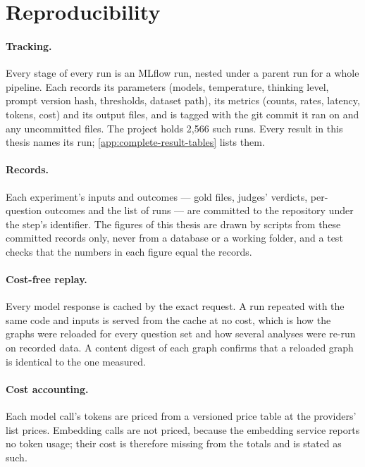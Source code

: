 \section{Reproducibility}\label{sec:ch03-reproducibility}

\paragraph{Tracking.} Every stage of every run is an MLflow run, nested under a parent run for a whole pipeline.
Each records its parameters (models, temperature, thinking level, prompt version hash, thresholds, dataset
path), its metrics (counts, rates, latency, tokens, cost) and its output files, and is tagged with the git
commit it ran on and any uncommitted files. The project holds 2{,}566 such runs. Every result in this thesis
names its run; \cref{app:complete-result-tables} lists them.

\paragraph{Records.} Each experiment's inputs and outcomes --- gold files, judges' verdicts, per-question
outcomes and the list of runs --- are committed to the repository under the step's identifier. The figures of
this thesis are drawn by scripts from these committed records only, never from a database or a working
folder, and a test checks that the numbers in each figure equal the records.

\paragraph{Cost-free replay.} Every model response is cached by the exact request. A run repeated with the same
code and inputs is served from the cache at no cost, which is how the graphs were reloaded for every question
set and how several analyses were re-run on recorded data. A content digest of each graph confirms that a
reloaded graph is identical to the one measured.

\paragraph{Cost accounting.} Each model call's tokens are priced from a versioned price table at the providers'
list prices. Embedding calls are not priced, because the embedding service reports no token usage; their cost
is therefore missing from the totals and is stated as such.

